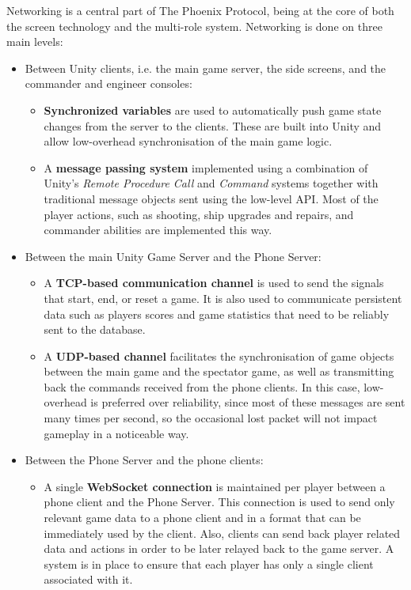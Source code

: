 \documentclass[a4paper,11pt]{article}
\begin{document}
Networking is a central part of The Phoenix Protocol, being at the core of both the screen technology and the multi-role system. Networking is done on three main levels:

\begin{itemize}
	\item Between Unity clients, i.e. the main game server, the side screens, and the commander and engineer consoles:
    
	\begin{itemize}[topsep=0ex]
      \item \textbf{Synchronized variables} are used to automatically push game state changes from the server to the clients. These are built into Unity and allow low-overhead synchronisation of the main game logic.
      \item A \textbf{message passing system} implemented using a combination of Unity’s  \emph{Remote Procedure Call} and \emph{Command} systems together with traditional message objects sent using the low-level API. Most of the player actions, such as shooting, ship upgrades and repairs, and commander abilities are implemented this way.
  	\end{itemize}
    
	\item Between the main Unity Game Server and the Phone Server:
    
  \begin{itemize}[topsep=0ex]
 	 \item A \textbf{TCP-based communication channel} is used to send the signals that start, end, or reset a game. It is also used to communicate persistent data such as players scores and game statistics that need to be reliably sent to the database.
 	 \item A \textbf{UDP-based channel} facilitates the synchronisation of game objects between the main game and the spectator game, as well as transmitting back the commands received from the phone clients. In this case, low-overhead is preferred over reliability, since most of these messages are sent many times per second, so the occasional lost packet will not impact gameplay in a noticeable way.
  \end{itemize}
  
\item Between the Phone Server and the phone clients:

  \begin{itemize}[topsep=0ex]
  	\item A single \textbf{WebSocket connection} is maintained per player between a phone client and the Phone Server. This connection is used to send only relevant game data to a phone client and in a format that can be immediately used by the client. Also, clients can send back player related data and actions in order to be later relayed back to the game server. A system is in place to ensure that each player has only a single client associated with it.
  \end{itemize}
  
\end{itemize}
\end{document}
